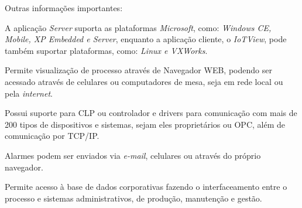         \begin{figure}[!h]
	    \end{figure}
	    
        Outras informações importantes:
        
        \begin{alineascomponto}
        	\item A aplicação \textit{Server} suporta as plataformas \textit{Microsoft}, como: \textit{Windows CE, Mobile, XP Embedded e Server}, enquanto a aplicação cliente, o \textit{IoTView}, pode também suportar plataformas, como: \textit{Linux e VXWorks}.
        	\item Permite visualização de processo através de Navegador \gls{WEB}, podendo ser acessado através de celulares ou computadores de mesa, seja em rede local ou pela \textit{internet}.
        	\item Possui suporte para \gls{CLP} ou controlador e drivers para comunicação com mais de 200 tipos de dispositivos e sistemas, sejam eles proprietários ou \gls{OPC}, além de comunicação por \gls{TCP/IP}.
        	\item Alarmes podem ser enviados via \textit{e-mail}, celulares ou através do próprio navegador.
        	\item Permite acesso à base de dados corporativas fazendo o interfaceamento entre o processo e sistemas administrativos, de produção, manutenção e gestão.
        \end{alineascomponto}


